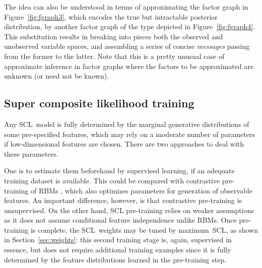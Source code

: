 \documentclass[english]{scrartcl}
\begin{document}
The idea can also be understood in terms of approximating the factor graph in Figure~\ref{fig:fgraph3}, which encodes the true but intractable posterior distribution, by another factor graph of the type depicted in Figure~\ref{fig:fgraph4}. This substitution results in breaking into pieces both the observed and unobserved variable spaces, and assembling a series of concise {\em messages} passing from the former to the latter. Note that this is a pretty unusual case of approximate inference in factor graphs where the factors to be approximated are unknown (or need not be known).

\subsection{Super composite likelihood training}

Any SCL~model is fully determined by the marginal generative distributions of some pre-specified features, which may rely on a moderate number of parameters if low-dimensional features are chosen. There are two approaches to deal with these parameters.

One is to estimate them beforehand by supervised learning, if an adequate training dataset is available. This could be compared with contrastive pre-training of RBMs \cite{Hinton-06,Fischer-14}, which also optimizes parameters for generation of observable features. An important difference, however, is that contrastive pre-training is unsupervised. On the other hand, SCL pre-training relies on weaker assumptions as it does not assume conditional feature independence unlike RBMs. Once pre-training is complete, the SCL~weights may be tuned by maximum~SCL, as shown in Section~\ref{sec:weights}: this second training stage is, again, supervised in essence, but does not require additional training examples since it is fully determined by the feature distributions learned in the pre-training step.


\end{document}
